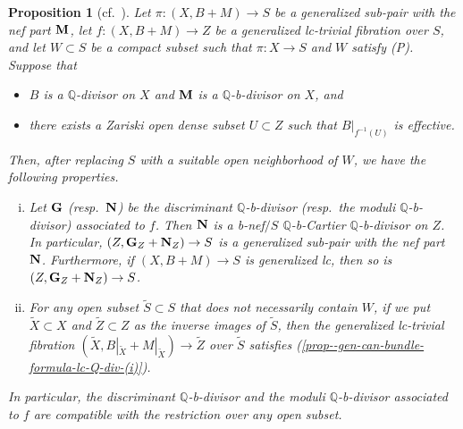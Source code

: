\documentclass[12pt]{amsart}
\newtheorem{prop}[thm]{Proposition}
\theoremstyle{definition}
\begin{document}
\begin{prop}[cf.~{\cite[Theorem 1.4]{filipazzi-gen-can-bundle-formula}}]\label{prop--gen-can-bundle-formula-lc-Q-div}
Let $\pi \colon (X,B+M) \to S$ be a generalized sub-pair with the nef part $\boldsymbol{\rm M}$, let $f\colon (X,B+M) \to Z$ be a generalized lc-trivial fibration over $S$, and let $W \subset S$ be a compact subset such that $\pi \colon X \to S$ and $W$ satisfy (P). 
Suppose that
\begin{itemize}
\item
$B$ is a $\mathbb{Q}$-divisor on $X$ and $\boldsymbol{\rm M}$ is a $\mathbb{Q}$-b-divisor on $X$, and
\item
there exists a Zariski open dense subset $U \subset Z$ such that $B|_{f^{-1}(U)}$ is effective.
\end{itemize}
Then, after replacing $S$ with a suitable open neighborhood of $W$, we have the following properties.
\begin{enumerate}[(i)]
\item \label{prop--gen-can-bundle-formula-lc-Q-div-(i)}
Let $\boldsymbol{\rm G}$ (resp.~$\boldsymbol{\rm N}$) be the discriminant $\mathbb{Q}$-b-divisor (resp.~the moduli $\mathbb{Q}$-b-divisor) associated to $f$. 
Then $\boldsymbol{\rm N}$ is a b-nef$/S$ $\mathbb{Q}$-b-Cartier $\mathbb{Q}$-b-divisor on $Z$. 
In particular, $(Z, \boldsymbol{\rm G}_{Z} +\boldsymbol{\rm N}_{Z}) \to S$ is a generalized sub-pair with the nef part $\boldsymbol{\rm N}$. 
Furthermore, if $(X,B+M) \to S$ is generalized lc, then so is $(Z, \boldsymbol{\rm G}_{Z} +\boldsymbol{\rm N}_{Z}) \to S$. 
\item \label{prop--gen-can-bundle-formula-lc-Q-div-(ii)}
For any open subset $\tilde{S} \subset S$ that does not necessarily contain $W$, if we put $\tilde{X} \subset X$ and $\tilde{Z} \subset Z$ as the inverse images of $\tilde{S}$, then the generalized lc-trivial fibration $(\tilde{X}, B|_{\tilde{X}}+M|_{\tilde{X}}) \to \tilde{Z}$ over $\tilde{S}$ satisfies (\ref{prop--gen-can-bundle-formula-lc-Q-div-(i)}). 
\end{enumerate}
In particular, the discriminant $\mathbb{Q}$-b-divisor and the moduli $\mathbb{Q}$-b-divisor associated to $f$ are compatible with the restriction over any open subset.   
\end{prop}
\end{document}
